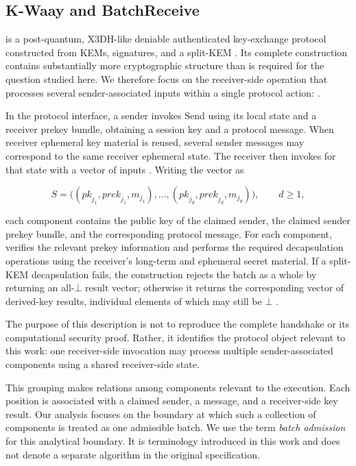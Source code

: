 \subsection{K-Waay and BatchReceive}

\kwaay is a post-quantum, X3DH-like deniable authenticated key-exchange
protocol constructed from KEMs, signatures, and a split-KEM
\cite{collins2024kwaay}. Its complete construction contains substantially
more cryptographic structure than is required for the question studied here.
We therefore focus on the receiver-side operation that processes several
sender-associated inputs within a single protocol action: \batchreceive.

In the protocol interface, a sender invokes \textsf{Send} using its local
state and a receiver prekey bundle, obtaining a session key and a protocol
message. When receiver ephemeral key material is reused, several sender
messages may correspond to the same receiver ephemeral state. The receiver
then invokes \batchreceive for that state with a vector of inputs
\cite[Sec.~4.1]{collins2024kwaayfull}. Writing the vector as

\begin{equation}
  S = \bigl((\mathit{pk}_{j_1},\mathit{prek}_{j_1},m_{j_1}),\ldots,
             (\mathit{pk}_{j_d},\mathit{prek}_{j_d},m_{j_d})\bigr),
  \qquad d \geq 1,
  \label{eq:kwaay-batch-input}
\end{equation}

each component contains the public key of the claimed sender, the claimed
sender prekey bundle, and the corresponding protocol message. For each
component, \batchreceive verifies the relevant prekey information and performs
the required decapsulation operations using the receiver's long-term and
ephemeral secret material. If a split-KEM decapsulation fails, the construction
rejects the batch as a whole by returning an all-$\bot$ result vector;
otherwise it returns the corresponding vector of derived-key results,
individual elements of which may still be $\bot$
\cite[Sec.~5.1, Fig.~10]{collins2024kwaayfull}.

The purpose of this description is not to reproduce the complete handshake or
its computational security proof. Rather, it identifies the protocol object
relevant to this work: one receiver-side invocation may process multiple
sender-associated components using a shared receiver-side state.

This grouping makes relations among components relevant to the execution.
Each position is associated with a claimed sender, a message, and a
receiver-side key result. Our analysis focuses on the boundary at which such
a collection of components is treated as one admissible batch. We use the
term \emph{batch admission} for this analytical boundary. It is terminology
introduced in this work and does not denote a separate algorithm in the
original \kwaay specification.

